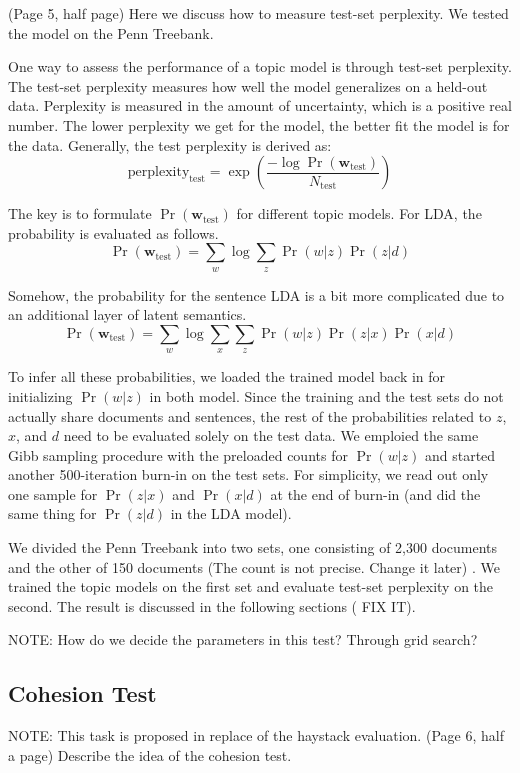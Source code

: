 { \color{red} (Page 5, half page) Here we discuss how to measure test-set
perplexity.  We tested the model on the Penn Treebank. }

One way to assess the performance of a topic model is through test-set
perplexity.  The test-set perplexity measures how well the model generalizes on
a held-out data.  Perplexity is measured in the amount of uncertainty, which is
a positive real number.  The lower perplexity we get for the model, the better
fit the model is for the data.  Generally, the test perplexity is derived as:
\[ \mathrm{perplexity_{test}} = \exp(\frac{- \log
\Pr(\mathbf{w}_\mathrm{test})}{N_\mathrm{test}}) \]

The key is to formulate $\Pr(\mathbf{w}_\mathrm{test})$ for different topic
models.  For LDA, the probability is evaluated as follows.  \[
\Pr(\mathbf{w}_\mathrm{test}) = \sum_w \log \sum_z \Pr(w|z) \Pr(z|d) \]

Somehow, the probability for the sentence LDA is a bit more complicated due to
an additional layer of latent semantics.  \[ \Pr(\mathbf{w}_\mathrm{test}) =
\sum_w \log \sum_x \sum_z \Pr(w|z) \Pr(z|x) \Pr(x|d) \]

To infer all these probabilities, we loaded the trained model back in for
initializing $\Pr(w|z)$ in both model.  Since the training and the test sets do
not actually share documents and sentences, the rest of the probabilities
related to $z$, $x$, and $d$ need to be evaluated solely on the test data.  We
emploied the same Gibb sampling procedure with the preloaded counts for
$\Pr(w|z)$ and started another 500-iteration burn-in on the test sets.  For
simplicity, we read out only one sample for $\Pr(z|x)$ and $\Pr(x|d)$ at the
end of burn-in (and did the same thing for $\Pr(z|d)$ in the LDA model).

We divided the Penn Treebank into two sets, one consisting of 2,300 documents
and the other of 150 documents { \color{red} (The count is not precise. Change
it later) }.  We trained the topic models on the first set and evaluate
test-set perplexity on the second.  The result is discussed in the following
sections ({\color{red} FIX IT}).

{ \color{red} NOTE: How do we decide the parameters in this test?  Through grid
search? }

\subsection{Cohesion Test}

{ \color{red} NOTE: This task is proposed in replace of the haystack evaluation. }
{ \color{red} (Page 6, half a page) Describe the idea of the cohesion test. }

